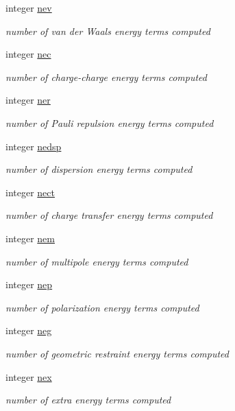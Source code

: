 \begin{DoxyCompactItemize}
integer \hyperlink{classaction_afec6e9aab1f027ea4cb09a04c3503ce4}{nev}
\begin{DoxyCompactList}\small\item\em number of van der Waals energy terms computed \end{DoxyCompactList}\item 
integer \hyperlink{classaction_ad4513f41298b1b1c80c08a7eb6549140}{nec}
\begin{DoxyCompactList}\small\item\em number of charge-\/charge energy terms computed \end{DoxyCompactList}\item 
integer \hyperlink{classaction_a6eb242f86fd27e833b7e32aaa2fc887c}{ner}
\begin{DoxyCompactList}\small\item\em number of Pauli repulsion energy terms computed \end{DoxyCompactList}\item 
integer \hyperlink{classaction_af966f559f230d5a1691eaff3323a3d2d}{nedsp}
\begin{DoxyCompactList}\small\item\em number of dispersion energy terms computed \end{DoxyCompactList}\item 
integer \hyperlink{classaction_a9e108e858cb8fc8521a9537c16bb0277}{nect}
\begin{DoxyCompactList}\small\item\em number of charge transfer energy terms computed \end{DoxyCompactList}\item 
integer \hyperlink{classaction_a107acd2a8e9143fe6069329b50d29b86}{nem}
\begin{DoxyCompactList}\small\item\em number of multipole energy terms computed \end{DoxyCompactList}\item 
integer \hyperlink{classaction_a5f4acddc07739f99eea41cdb6be1b8dc}{nep}
\begin{DoxyCompactList}\small\item\em number of polarization energy terms computed \end{DoxyCompactList}\item 
integer \hyperlink{classaction_afd909afc671accddccd25524191f0352}{neg}
\begin{DoxyCompactList}\small\item\em number of geometric restraint energy terms computed \end{DoxyCompactList}\item 
integer \hyperlink{classaction_ab44cc1b8e1bff00461e4a7a7595560a3}{nex}
\begin{DoxyCompactList}\small\item\em number of extra energy terms computed \end{DoxyCompactList}\end{DoxyCompactItemize}


